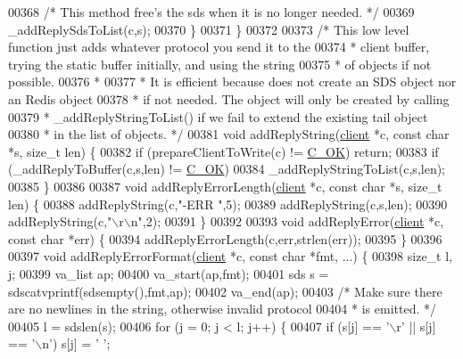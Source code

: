 \begin{DoxyCode}
00368         \textcolor{comment}{/* This method free's the sds when it is no longer needed. */}
00369         \_addReplySdsToList(c,s);
00370     \}
00371 \}
00372 
00373 \textcolor{comment}{/* This low level function just adds whatever protocol you send it to the}
00374 \textcolor{comment}{ * client buffer, trying the static buffer initially, and using the string}
00375 \textcolor{comment}{ * of objects if not possible.}
00376 \textcolor{comment}{ *}
00377 \textcolor{comment}{ * It is efficient because does not create an SDS object nor an Redis object}
00378 \textcolor{comment}{ * if not needed. The object will only be created by calling}
00379 \textcolor{comment}{ * \_addReplyStringToList() if we fail to extend the existing tail object}
00380 \textcolor{comment}{ * in the list of objects. */}
00381 \textcolor{keywordtype}{void} addReplyString(\hyperlink{structclient}{client} *c, \textcolor{keyword}{const} \textcolor{keywordtype}{char} *s, size\_t len) \{
00382     \textcolor{keywordflow}{if} (prepareClientToWrite(c) != \hyperlink{server_8h_a303769ef1065076e68731584e758d3e1}{C\_OK}) \textcolor{keywordflow}{return};
00383     \textcolor{keywordflow}{if} (\_addReplyToBuffer(c,s,len) != \hyperlink{server_8h_a303769ef1065076e68731584e758d3e1}{C\_OK})
00384         \_addReplyStringToList(c,s,len);
00385 \}
00386 
00387 \textcolor{keywordtype}{void} addReplyErrorLength(\hyperlink{structclient}{client} *c, \textcolor{keyword}{const} \textcolor{keywordtype}{char} *s, size\_t len) \{
00388     addReplyString(c,\textcolor{stringliteral}{"-ERR "},5);
00389     addReplyString(c,s,len);
00390     addReplyString(c,\textcolor{stringliteral}{"\(\backslash\)r\(\backslash\)n"},2);
00391 \}
00392 
00393 \textcolor{keywordtype}{void} addReplyError(\hyperlink{structclient}{client} *c, \textcolor{keyword}{const} \textcolor{keywordtype}{char} *err) \{
00394     addReplyErrorLength(c,err,strlen(err));
00395 \}
00396 
00397 \textcolor{keywordtype}{void} addReplyErrorFormat(\hyperlink{structclient}{client} *c, \textcolor{keyword}{const} \textcolor{keywordtype}{char} *fmt, ...) \{
00398     size\_t l, j;
00399     va\_list ap;
00400     va\_start(ap,fmt);
00401     sds s = sdscatvprintf(sdsempty(),fmt,ap);
00402     va\_end(ap);
00403     \textcolor{comment}{/* Make sure there are no newlines in the string, otherwise invalid protocol}
00404 \textcolor{comment}{     * is emitted. */}
00405     l = sdslen(s);
00406     \textcolor{keywordflow}{for} (j = 0; j < l; j++) \{
00407         \textcolor{keywordflow}{if} (s[j] == \textcolor{stringliteral}{'\(\backslash\)r'} || s[j] == \textcolor{stringliteral}{'\(\backslash\)n'}) s[j] = \textcolor{stringliteral}{' '};

\end{DoxyCode}
